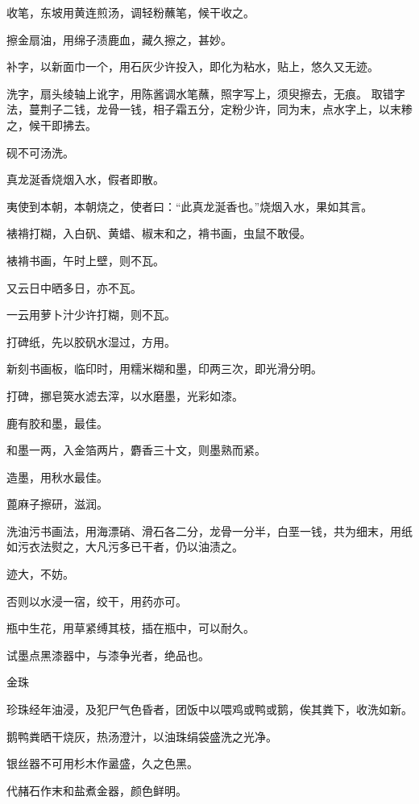 \documentclass[a4paper,12pt,UTF8,twoside]{ctexbook}
\begin{document}
    收笔，东坡用黄连煎汤，调轻粉蘸笔，候干收之。
    
    擦金扇油，用绵子渍鹿血，藏久擦之，甚妙。
    
    补字，以新面巾一个，用石灰少许投入，即化为粘水，贴上，悠久又无迹。
    
    洗字，扇头绫轴上讹字，用陈酱调水笔蘸，照字写上，须臾擦去，无痕。 取错字法，蔓荆子二钱，龙骨一钱，相子霜五分，定粉少许，同为末，点水字上，以末糁之，候干即拂去。
    
    砚不可汤洗。
    
    真龙涎香烧烟入水，假者即散。
    
    夷使到本朝，本朝烧之，使者曰：“此真龙涎香也。”烧烟入水，果如其言。
    
    裱褙打糊，入白矾、黄蜡、椒末和之，褙书画，虫鼠不敢侵。
    
    裱褙书画，午时上壁，则不瓦。
    
    又云日中晒多日，亦不瓦。
    
    一云用萝卜汁少许打糊，则不瓦。
    
    打碑纸，先以胶矾水湿过，方用。
    
    新刻书画板，临印时，用糯米糊和墨，印两三次，即光滑分明。
    
    打碑，挪皂筴水滤去滓，以水磨墨，光彩如漆。
    
    鹿有胶和墨，最佳。
    
    和墨一两，入金箔两片，麝香三十文，则墨熟而紧。
    
    造墨，用秋水最佳。
    
    蓖麻子擦研，滋润。
    
    洗油污书画法，用海漂硝、滑石各二分，龙骨一分半，白垩一钱，共为细末，用纸如污衣法熨之，大凡污多已干者，仍以油渍之。
    
    迹大，不妨。
    
    否则以水浸一宿，绞干，用药亦可。
    
    瓶中生花，用草紧缚其枝，插在瓶中，可以耐久。
    
    试墨点黑漆器中，与漆争光者，绝品也。
    
    金珠
    
    珍珠经年油浸，及犯尸气色昏者，团饭中以喂鸡或鸭或鹅，俟其粪下，收洗如新。
    
    鹅鸭粪晒干烧灰，热汤澄汁，以油珠绢袋盛洗之光净。
    
    银丝器不可用杉木作盝盛，久之色黑。
    
    代赭石作末和盐煮金器，颜色鲜明。
    
\end{document}
